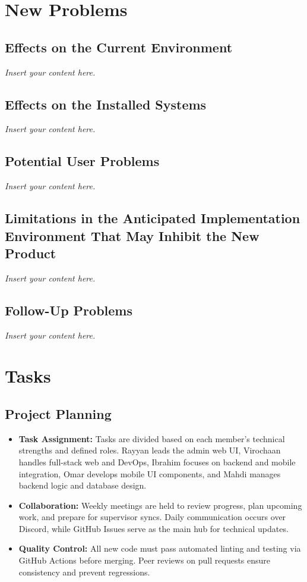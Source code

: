 \documentclass[12pt]{article}
\newcommand{\lips}{\textit{Insert your content here.}}
\begin{document}
\section{New Problems}
\subsection{Effects on the Current Environment}
\lips
\subsection{Effects on the Installed Systems}
\lips
\subsection{Potential User Problems}
\lips
\subsection{Limitations in the Anticipated Implementation Environment That May
Inhibit the New Product}
\lips
\subsection{Follow-Up Problems}
\lips

\section{Tasks}
\subsection{Project Planning }

\begin{itemize}
    \item \textbf{Task Assignment:} Tasks are divided based on each member’s technical strengths and defined roles.
    Rayyan leads the admin web UI, Virochaan handles full-stack web and DevOps, Ibrahim focuses on backend and mobile integration, Omar develops mobile UI components, and Mahdi manages backend logic and database design.
    \item \textbf{Collaboration:} Weekly meetings are held to review progress, plan upcoming work, and prepare for supervisor syncs.
    Daily communication occurs over Discord, while GitHub Issues serve as the main hub for technical updates.
    \item \textbf{Quality Control:} All new code must pass automated linting and testing via GitHub Actions before merging.
    Peer reviews on pull requests ensure consistency and prevent regressions.
\end{itemize}
\end{document}
